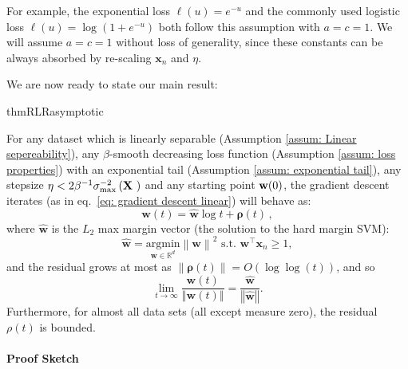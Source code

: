 \documentclass[twoside,11pt,english]{article}
\newcommand{\norm}[1]{\left\lVert{#1}\right\rVert}
\begin{document}
For example, the exponential loss $\ell\left(u\right)=e^{-u}$ and
the commonly used logistic loss $\ell\left(u\right)=\log\left(1+e^{-u}\right)$
both follow this assumption with $a=c=1$. We will assume $a=c=1$
\textemdash{} without loss of generality, since these constants can
be always absorbed by re-scaling $\mathbf{x}_{n}$ and $\eta$.

We are now ready to state our main result:
\begin{restatable}{thmR}{LRasymptotic}

\label{thm: main theorem} For any dataset which is linearly separable (Assumption
\ref{assum: Linear sepereability}), any $\beta$-smooth decreasing
loss function (Assumption \ref{assum: loss properties}) with an exponential
tail (Assumption \ref{assum: exponential tail}), any stepsize $\eta<2\beta^{-1}\sigma_{\max}^{-2}\left(\text{\ensuremath{\mathbf{X}} }\right)$
and any starting point $\mathbf{w}(0)$, the gradient descent iterates (as in eq.~\ref{eq: gradient descent linear}) will behave as: 
\begin{equation}
\mathbf{w}\left(t\right)=\hat{\mathbf{w}}\log t+\boldsymbol{\rho}\left(t\right)\,,\label{eq: asymptotic form}
\end{equation}
where $\hat{\mathbf{w}}$ is the $L_{2}$ max margin vector (the solution
to the hard margin SVM): 
\begin{equation}
\hat{\mathbf{w}}=\underset{\mathbf{\mathbf{w}}\in\mathbb{R}^{d}}{\mathrm{argmin}}\left\lVert \mathbf{w}\right\rVert ^{2}\,\,\mathrm{s.t.}\,\,\mathbf{w}^{\top}\mathbf{x}_{n}\geq1,\label{eq: max margin vector}
\end{equation}
and the residual grows at most as $\norm{\boldsymbol{\rho}\left(t\right)}=O(\log \log (t) )$, and
so 
\[
\lim_{t\rightarrow\infty}\frac{\mathbf{w}\left(t\right)}{\left\Vert \mathbf{w}\left(t\right)\right\Vert }=\frac{\hat{\mathbf{w}}}{\left\Vert \hat{\mathbf{w}}\right\Vert }.
\]
Furthermore, for almost all data sets (all except measure zero), the residual $\rho(t)$ is bounded.
\end{restatable}


\paragraph{Proof Sketch}
\end{document}
